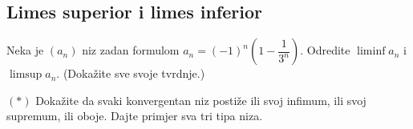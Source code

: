 \subsection*{Limes superior i limes inferior}
\begin{exercise}
Neka je $(a_n)$ niz zadan formulom $a_n=(-1)^n\left(1-\dfrac{1}{3^n}\right)$. Odredite $\liminf{a_n}$ i $\limsup{a_n}$. (Dokažite sve svoje tvrdnje.)
\end{exercise}
\begin{exercise} $(*)$
Dokažite da svaki konvergentan niz postiže ili svoj infimum, ili svoj supremum, ili oboje. Dajte primjer sva tri tipa niza.
\end{exercise}